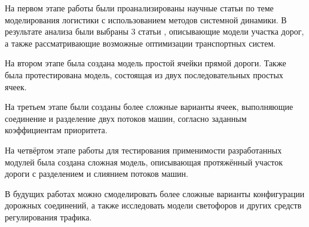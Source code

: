 

На первом этапе работы были проанализированы научные статьи по теме моделирования логистики с использованием методов системной динамики. В результате анализа были выбраны 3 статьи \cite{benaich2015exploring,jin2022variable,crainic2009models}, описывающие модели участка дорог, а также рассматривающие возможные оптимизации транспортных систем.

На втором этапе была создана модель простой ячейки прямой дороги. Также была протестирована модель, состоящая из двух последовательных простых ячеек.

На третьем этапе были созданы более сложные варианты ячеек, выполняющие соединение и разделение двух потоков машин, согласно заданным коэффициентам приоритета.

На четвёртом этапе работы для тестирования применимости разработанных модулей была создана сложная модель, описывающая протяжённый участок дороги с разделением и слиянием потоков машин.

В будущих работах можно смоделировать более сложные варианты конфигурации дорожных соединений, а также исследовать модели светофоров и других средств регулирования трафика.

\clearpage